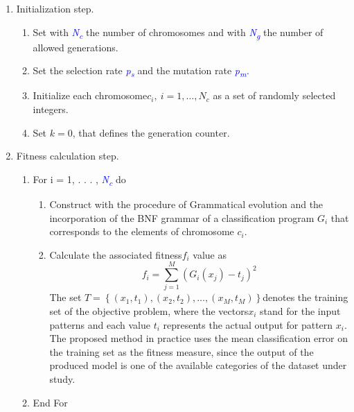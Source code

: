 \documentclass[12pt]{Definitions/academia}
\begin{document}
\begin{enumerate}
\item Initialization step.
\begin{enumerate}
\item Set with \textit{\textcolor{blue}{N\textsubscript{c}}} the number
of chromosomes and with \textit{\textcolor{blue}{N\textsubscript{g}}}
the number of allowed generations.
\item Set the selection rate \textit{\textcolor{blue}{p\textsubscript{s}
}}and the mutation rate \textit{\textcolor{blue}{p\textsubscript{m}.}}
\item Initialize each chromosome$c_{i},\ i=1,\ldots,N_{c}$ as a set of
randomly selected integers.
\item Set $k=0$, that defines the generation counter.
\end{enumerate}
\vspace{2em}
\item Fitness calculation step.
\begin{enumerate}
\item For i = 1, . . . , \textit{\textcolor{blue}{N\textsubscript{c}}}
do
\vspace{2em}
\begin{enumerate}
\item Construct with the procedure of Grammatical evolution and the incorporation
of the BNF grammar of  a classification
program $G_{i}$ that corresponds to the elements of chromosome $c_{i}$.
\item Calculate the associated fitness$f_{i}$ value as
\begin{equation}
f_{i}=\sum_{j=1}^{M}\left(G_{i}\left(x_{j}\right)-t_{j}\right)^{2}
\end{equation}
The set $T=\left\{ \left(x_{1},t_{1}\right),\left(x_{2},t_{2}\right),\ldots,\left(x_{M},t_{M}\right)\right\} $denotes
the training set of the objective problem, where the vectors$x_{i}$
stand for the input patterns and each value $t_{i}$ represents the actual
output for pattern $x_{i}$. \\
The proposed method in practice uses
the mean classification error on the training set as the fitness measure,
since the output of the produced model is one of the available categories
of the dataset under study.
\end{enumerate}
\item End For \clearpage 
\end{enumerate}
\vspace{1em}

\end{enumerate}
\end{document}
